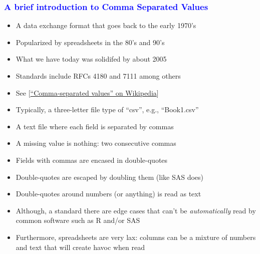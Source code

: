\documentclass[11pt,pdftex,dvipsnames,usenames]{beamer}
\begin{document}
\begin{frame}[fragile]\frametitle{\bf\textcolor{blue}{A brief
introduction to Comma Separated Values}}

\begin{itemize}
\item A data exchange format that goes back to the early 1970's
\item Popularized by spreadsheets in the 80's and 90's
\item What we have today was solidifed by about 2005 
\item Standards include RFCs 4180 and 7111 among others
\item See \textcolor{PineGreen}{[\href{https://en.wikipedia.org/wiki/Comma-separated_values}
{``Comma-separated values'' on Wikipedia}]}
\item Typically, a three-letter file type of ``csv'',
e.g., ``Book1.csv''
\item A text file where each field is separated by commas
\item A missing value is nothing: two consecutive commas
\item Fields with commas are encased in double-quotes
\item Double-quotes are escaped by doubling them (like SAS does)
\item Double-quotes around numbers (or anything) is read as text 
\item Although, a standard there are edge cases that can't be
  {\it automatically} read by common software such as R and/or SAS
\item Furthermore, spreadsheets are very lax: columns can be a mixture of numbers and text that will create havoc when read
\end{itemize}

\end{frame}
\end{document}
